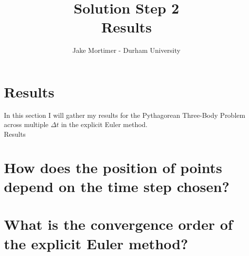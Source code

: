\documentclass{article}
\title{Solution Step 2 \\ Results}
\author{Jake Mortimer - Durham University}
\begin{document}
\maketitle
\section{Results}
In this section I will gather my results for the Pythagorean Three-Body Problem across multiple $\Delta t$ in the explicit Euler method. \\
Results\\

\section{How does the position of points depend on the time step chosen?}

\section{What is the convergence order of the explicit Euler method?}
\end{document}
